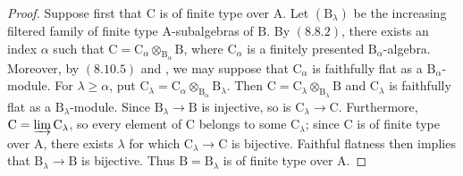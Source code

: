 \begin{proof}
Suppose first that $\mathrm{C}$ is of finite type over $\mathrm{A}$. Let $(\mathrm{B}_\lambda)$ be the increasing filtered family of finite type $\mathrm{A}$-subalgebras of $\mathrm{B}$. By $(8.8.2)$, there exists an index $\alpha$ such that $\mathrm{C}=\mathrm{C}_\alpha\otimes_{\mathrm{B}_\alpha}\mathrm{B}$,
where $\mathrm{C}_\alpha$ is a finitely presented $\mathrm{B}_\alpha$-algebra. Moreover, by $(8.10.5)$ and , we may suppose that $\mathrm{C}_\alpha$ is faithfully flat as a $\mathrm{B}_\alpha$-module. For $\lambda\geqslant\alpha$, put $\mathrm{C}_\lambda
=\mathrm{C}_\alpha\otimes_{\mathrm{B}_\alpha}\mathrm{B}_\lambda$.
Then $\mathrm{C}=\mathrm{C}_\lambda\otimes_{\mathrm{B}_\lambda}\mathrm{B}$ and $\mathrm{C}_\lambda$ is faithfully flat as a $\mathrm{B}_\lambda$-module. Since $\mathrm{B}_\lambda\to\mathrm{B}$ is injective, so is $\mathrm{C}_\lambda\to\mathrm{C}$. Furthermore, $\mathrm{C}=\varinjlim\mathrm{C}_\lambda$, so every element of $\mathrm{C}$ belongs to some $\mathrm{C}_\lambda$; since $\mathrm{C}$ is of finite type over $\mathrm{A}$, there exists $\lambda$ for which $\mathrm{C}_\lambda\to\mathrm{C}$  is bijective. Faithful flatness then implies that $\mathrm{B}_\lambda\to\mathrm{B}$ is bijective. Thus $\mathrm{B}=\mathrm{B}_\lambda$ is of finite type over $\mathrm{A}$.


\end{proof}

